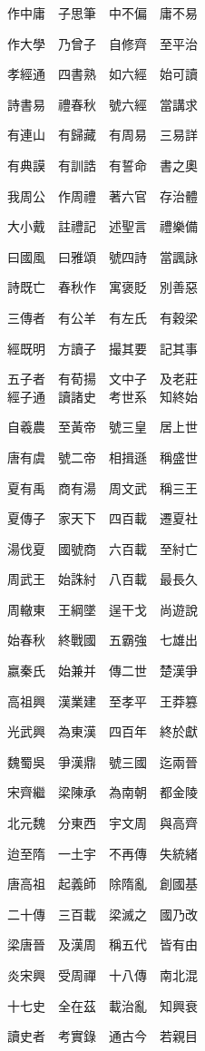 \documentclass[a4paper,twocolumn]{article}
\begin{document}
\begin{Large}
作中庸　子思筆　中不偏　庸不易　

作大學　乃曾子　自修齊　至平治　

孝經通　四書熟　如六經　始可讀　

詩書易　禮春秋　號六經　當講求　

有連山　有歸藏　有周易　三易詳　

有典謨　有訓誥　有誓命　書之奧　

我周公　作周禮　著六官　存治體　

大小戴　註禮記　述聖言　禮樂備　

曰國風　曰雅頌　號四詩　當諷詠　

詩既亡　春秋作　寓褒貶　別善惡　

三傳者　有公羊　有左氏　有穀梁　

經既明　方讀子　撮其要　記其事　

五子者　有荀揚　文中子　及老莊　
\\

經子通　讀諸史　考世系　知終始　

自羲農　至黃帝　號三皇　居上世　

唐有虞　號二帝　相揖遜　稱盛世　

夏有禹　商有湯　周文武　稱三王　

夏傳子　家天下　四百載　遷夏社　

湯伐夏　國號商　六百載　至紂亡　

周武王　始誅紂　八百載　最長久　

周轍東　王綱墜　逞干戈　尚遊說　

始春秋　終戰國　五霸強　七雄出　

嬴秦氏　始兼并　傳二世　楚漢爭　

高祖興　漢業建　至孝平　王莽篡　

光武興　為東漢　四百年　終於獻　

魏蜀吳　爭漢鼎　號三國　迄兩晉　

宋齊繼　梁陳承　為南朝　都金陵　

北元魏　分東西　宇文周　與高齊　

迨至隋　一土宇　不再傳　失統緒　

唐高祖　起義師　除隋亂　創國基　

二十傳　三百載　梁滅之　國乃改　

梁唐晉　及漢周　稱五代　皆有由　

炎宋興　受周禪　十八傳　南北混　

十七史　全在茲　載治亂　知興衰　

讀史者　考實錄　通古今　若親目　


\end{Large}
\end{document}
